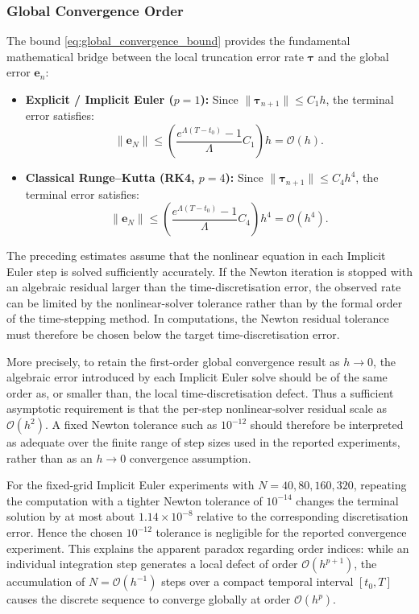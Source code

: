 \subsubsection{Global Convergence Order}
The bound \eqref{eq:global_convergence_bound} provides the fundamental mathematical bridge between the local truncation error rate $\boldsymbol{\tau}$ and the global error $\mathbf{e}_n$:
\begin{itemize}
    \item \textbf{Explicit / Implicit Euler ($p=1$):} Since $\|\boldsymbol{\tau}_{n+1}\| \le C_1 h$, the terminal error satisfies:
    \begin{equation}
    \label{eq:euler_global_order}
    \|\mathbf{e}_N\| \le \left( \frac{e^{\Lambda(T - t_0)} - 1}{\Lambda} C_1 \right) h = \mathcal{O}(h).
    \end{equation}
    \item \textbf{Classical Runge--Kutta (RK4, $p=4$):} Since $\|\boldsymbol{\tau}_{n+1}\| \le C_4 h^4$, the terminal error satisfies:
    \begin{equation}
    \label{eq:rk4_global_order}
    \|\mathbf{e}_N\| \le \left( \frac{e^{\Lambda(T - t_0)} - 1}{\Lambda} C_4 \right) h^4 = \mathcal{O}(h^4).
    \end{equation}
\end{itemize}
The preceding estimates assume that the nonlinear equation in each
Implicit Euler step is solved sufficiently accurately. If the Newton
iteration is stopped with an algebraic residual larger than the
time-discretisation error, the observed rate can be limited by the
nonlinear-solver tolerance rather than by the formal order of the
time-stepping method. In computations, the Newton residual tolerance
must therefore be chosen below the target time-discretisation error.

More precisely, to retain the first-order global convergence result
as $h\to0$, the algebraic error introduced by each Implicit Euler
solve should be of the same order as, or smaller than, the local
time-discretisation defect. Thus a sufficient asymptotic requirement
is that the per-step nonlinear-solver residual scale as $\mathcal{O}(h^2)$.
A fixed Newton tolerance such as $10^{-12}$ should therefore be
interpreted as adequate over the finite range of step sizes used in
the reported experiments, rather than as an $h\to0$ convergence
assumption.

For the fixed-grid Implicit Euler experiments with
$N=40,80,160,320$, repeating the computation with a tighter Newton
tolerance of $10^{-14}$ changes the terminal solution by at most about
$1.14\times10^{-8}$ relative to the corresponding discretisation
error. Hence the chosen $10^{-12}$ tolerance is negligible for the
reported convergence experiment.
This explains the apparent paradox regarding order indices: while an individual integration step generates a local defect of order $\mathcal{O}(h^{p+1})$, the accumulation of $N = \mathcal{O}(h^{-1})$ steps over a compact temporal interval $[t_0, T]$ causes the discrete sequence to converge globally at order $\mathcal{O}(h^p)$.


